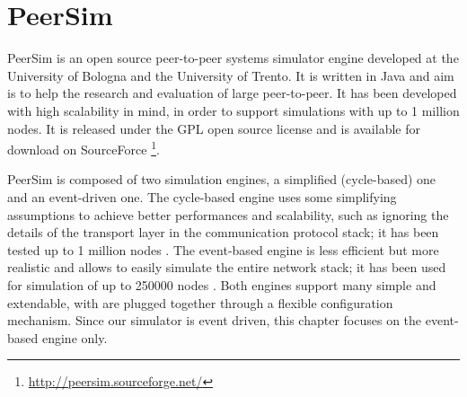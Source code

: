 \section{PeerSim}
PeerSim \cite{peersim_2009} is an open source peer-to-peer systems simulator engine developed at the University of Bologna and the University of Trento.
It is written in Java and aim is to help the research and evaluation of large peer-to-peer.
It has been developed with high scalability in mind, in order to support simulations with up to \num{1} million nodes.
It is released under the GPL open source license and is available for download on SourceForce \footnote{\url{http://peersim.sourceforge.net/}}.

\smallskip
PeerSim is composed of two simulation engines, a simplified (cycle-based) one and an event-driven one.
The cycle-based engine uses some simplifying assumptions to achieve better performances and scalability, such as ignoring the details of the transport layer in the communication protocol stack;
it has been tested up to \num{1} million nodes \cite{peersim_intro_2018}.
The event-based engine is less efficient but more realistic and allows to easily simulate the entire network stack;
it has been used for simulation of up to \num{250000} nodes \cite{peersim_intro_2018}.
Both engines support many simple and extendable, with are plugged together through a flexible configuration mechanism.
Since our simulator is event driven, this chapter focuses on the event-based engine only.
